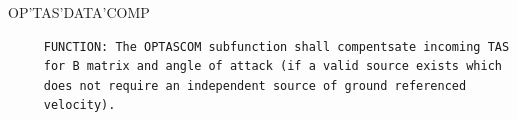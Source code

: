 \begin{frame}
OP'TAS'DATA'COMP
\begin{verbatim}
     FUNCTION: The OPTASCOM subfunction shall compentsate incoming TAS
     for B matrix and angle of attack (if a valid source exists which
     does not require an independent source of ground referenced
     velocity).

\end{verbatim}
\end{frame}
